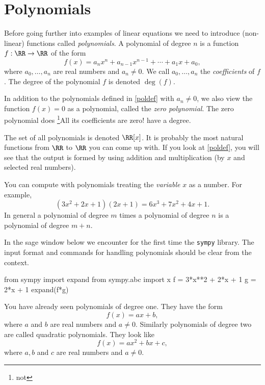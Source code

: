 \documentclass{article}
\begin{document}
\section{Polynomials}\label{section:polynomials}

Before going further into examples of linear equations we need to introduce (non-linear)
functions called \emph{polynomials}. A polynomial of degree $n$ is a function $f:\RR\rightarrow \RR$
of the form
\begin{equation}\label{poldef}
f(x) = a_n x^n + a_{n-1} x^{n-1} + \cdots + a_1 x + a_0,
\end{equation}
where $a_0, \dots, a_n$ are real numbers and $a_n\neq 0$. We call $a_0, \dots, a_n$
the \emph{coefficients} of $f$.
The degree of the polynomial $f$ is denoted
$\deg(f)$.

In addition to the polynomials defined in \eqref{poldef} with $a_n\neq 0$,
we also view the function $f(x) = 0$ as a polynomial, called the \emph{zero polynomial}.
The zero polynomial does \footnote{not}{All its coefficients are zero!} have a degree.

The set of all polynomials is denoted
$\RR[x]$. 
It is probably the most natural functions from $\RR$ to $\RR$ you can come up with.
If you look at \eqref{poldef}, you will see that the output is formed by using
addition and multiplication (by $x$ and selected real numbers).



You can compute with polynomials treating the \emph{variable} $x$ as
a number. For example,
$$
(3 x^2 + 2 x + 1) (2 x + 1) = 6 x^3 + 7 x^2 + 4 x + 1.
$$
In general a polynomial of degree $m$ times a polynomial of degree $n$ is a
polynomial of degree $m+n$.


In the sage window below we encounter for the first time the \texttt{sympy} library. The
input format and commands for handling polynomials should be clear from the context.

\begin{sage}
from sympy import expand
from sympy.abc import x
f = 3*x**2 + 2*x + 1
g = 2*x + 1
expand(f*g)
\end{sage}


You have already seen polynomials
of degree one. They have the form
$$
f(x) = a x + b,
$$
where $a$ and $b$ are real numbers and $a\neq 0$. Similarly
polynomials of degree two are called quadratic polynomials. They look
like
$$
f(x) = a x^2 + b x + c,
$$
where $a, b$ and $c$ are real numbers and $a\neq 0$. 
\end{document}
